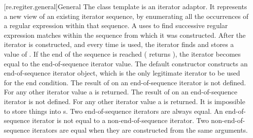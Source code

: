 [re.regiter.general]{General}
\pnum
{}%
%
The class template  is an iterator adaptor.
It represents a new view of an existing iterator sequence, by
enumerating all the occurrences of a regular expression within that
sequence. A  uses   to find successive
regular expression matches within the sequence from which it was
constructed.  After the iterator is constructed, and every time  is
used, the iterator finds and stores a value of
. If the end of the sequence is
reached ( returns ), the iterator becomes equal to
the end-of-sequence iterator value. The default constructor
constructs an end-of-sequence iterator object,
which is the only legitimate iterator to be used for the end
condition. The result of  on an end-of-sequence iterator is not
defined. For any other iterator value a
 is returned. The result of
 on an end-of-sequence iterator is not defined. For any other
iterator value a  is
returned. It is impossible to store things into s. Two
end-of-sequence iterators are always equal. An end-of-sequence
iterator is not equal to a non-end-of-sequence iterator. Two
non-end-of-sequence iterators are equal when they are constructed from
the same arguments.

